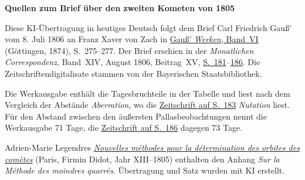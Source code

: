 \clearpage\thispagestyle{empty}
\begin{center}\textbf{Quellen zum Brief über den zweiten Kometen von 1805}\end{center}
\noindent Diese KI-Übertragung in heutiges Deutsch folgt dem Brief Carl Friedrich Gauß’ vom 8. Juli 1806 an Franz Xaver von Zach in \href{https://gdz.sub.uni-goettingen.de/id/PPN236007467}{Gauß’ \textit{Werken}, Band~VI} (Göttingen, 1874), S.~275--277. Der Brief erschien in der \textit{Monatlichen Correspondenz}, Band~XIV, August 1806, Beitrag~XV, \href{https://www.digitale-sammlungen.de/en/view/bsb10538606?page=195}{S.~181}--\href{https://www.digitale-sammlungen.de/en/view/bsb10538606?page=200}{186}. Die Zeitschriftendigitalisate stammen von der Bayerischen Staatsbibliothek.
\par\medskip
Die Werkausgabe enthält die Tagesbruchteile in der Tabelle und liest nach dem Vergleich der Abstände \textit{Aberration}, wo die \href{https://www.digitale-sammlungen.de/en/view/bsb10538606?page=197}{Zeitschrift auf S.~183} \textit{Nutation} liest. Für den Abstand zwischen den äußersten Pallasbeobachtungen nennt die Werkausgabe 71 Tage, die \href{https://www.digitale-sammlungen.de/en/view/bsb10538606?page=200}{Zeitschrift auf S.~186} dagegen 73 Tage.
\par\medskip
Adrien-Marie Legendres \href{https://www.e-rara.ch/zut/content/titleinfo/10838079}{\textit{Nouvelles méthodes pour la détermination des orbites des comètes}} (Paris, Firmin Didot, Jahr XIII--1805) enthalten den Anhang \textit{Sur la Méthode des moindres quarrés}. Übertragung und Satz wurden mit KI erstellt.
\clearpage

